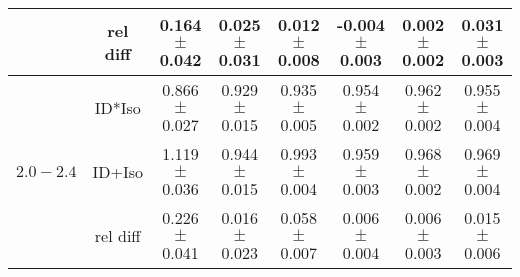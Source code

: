 \begin{table}[!hbt]
{\begin{minipage}{\textwidth}
\begin{tabular}{c|c|c|c|c|c|c|c}
                              & rel diff & 0.164 $\pm$ 0.042 & 0.025 $\pm$ 0.031  & 0.012 $\pm$ 0.008  & -0.004 $\pm$ 0.003 & 0.002 $\pm$ 0.002  & 0.031 $\pm$ 0.003  \\ \hline
\multirow{3}{*}{$2.0-2.4$}    & ID*Iso   & 0.866 $\pm$ 0.027 & 0.929 $\pm$ 0.015  & 0.935 $\pm$ 0.005  & 0.954 $\pm$ 0.002  & 0.962 $\pm$ 0.002  & 0.955 $\pm$ 0.004  \\
                              & ID+Iso   & 1.119 $\pm$ 0.036 & 0.944 $\pm$ 0.015  & 0.993 $\pm$ 0.004  & 0.959 $\pm$ 0.003  & 0.968 $\pm$ 0.002  & 0.969 $\pm$ 0.004  \\
                              & rel diff & 0.226 $\pm$ 0.041 & 0.016 $\pm$ 0.023  & 0.058 $\pm$ 0.007  & 0.006 $\pm$ 0.004  & 0.006 $\pm$ 0.003  & 0.015 $\pm$ 0.006  \\ \hline \hline
\end{tabular}
\end{minipage}
}
\end{table}

